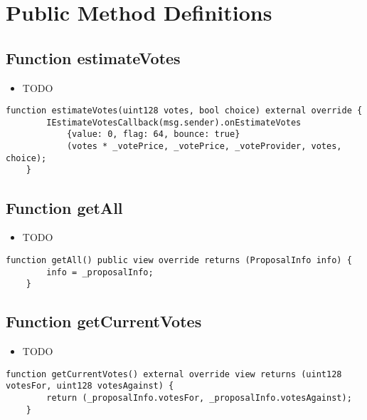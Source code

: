 \section{Public Method Definitions}


\subsection{Function estimateVotes}

\begin{itemize}
\item TODO
\end{itemize}

\begin{lstlisting}[firstnumber=78]
    function estimateVotes(uint128 votes, bool choice) external override {
        IEstimateVotesCallback(msg.sender).onEstimateVotes
            {value: 0, flag: 64, bounce: true}
            (votes * _votePrice, _votePrice, _voteProvider, votes, choice);
    }
\end{lstlisting}

\subsection{Function getAll}

\begin{itemize}
\item TODO
\end{itemize}

\begin{lstlisting}[firstnumber=199]
    function getAll() public view override returns (ProposalInfo info) {
        info = _proposalInfo;
    }
\end{lstlisting}

\subsection{Function getCurrentVotes}

\begin{itemize}
\item TODO
\end{itemize}

\begin{lstlisting}[firstnumber=212]
    function getCurrentVotes() external override view returns (uint128 votesFor, uint128 votesAgainst) {
        return (_proposalInfo.votesFor, _proposalInfo.votesAgainst);
    }
\end{lstlisting}

